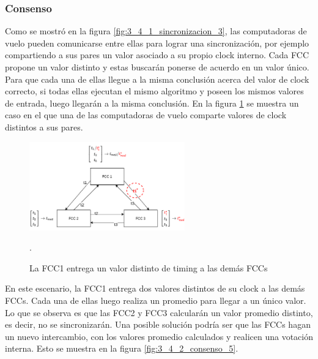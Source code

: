 \subsubsection{Consenso}\label{sec:consenso}

Como se mostró en la figura \ref{fig:3_4_1_sincronizacion_3}, las computadoras de vuelo pueden comunicarse entre ellas para lograr una sincronización, por ejemplo compartiendo a sus pares un valor asociado a su propio clock interno. Cada FCC propone un valor distinto y estas buscarán ponerse de acuerdo en un valor único. Para que cada una de ellas llegue a la misma conclusión acerca del valor de clock correcto, si todas ellas ejecutan el mismo algoritmo y poseen los mismos valores de entrada, luego llegarán a la misma conclusión. En la figura \ref{fig:3_4_2_consenso_4} se muestra un caso en el que una de las computadoras de vuelo comparte valores de clock distintos a sus pares.

\begin{figure}[H]
    \centering
    \includegraphics[width=0.6\textwidth]{img/3_4_2_consenso_4.png}
    \caption{La FCC1 entrega un valor distinto de timing a las demás FCCs}.
    \label{fig:3_4_2_consenso_4}
\end{figure}

En este escenario, la FCC1 entrega dos valores distintos de su clock a las demás FCCs. Cada una de ellas luego realiza un promedio para llegar a un único valor. Lo que se observa es que las FCC2 y FCC3 calcularán un valor promedio distinto, es decir, no se sincronizarán.
Una posible solución podría ser que las FCCs hagan un nuevo intercambio, con los valores promedio calculados y realicen una votación interna. Esto se muestra en la figura \ref{fig:3_4_2_consenso_5}.

